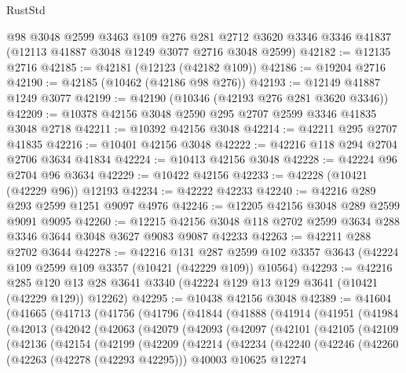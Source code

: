 \begin{lexlean}{RustStd}
\begin{coremodule}
    @98
    @3048
    @2599
    @3463
    @109
    @276
    @281
    @2712
    @3620
    @3346
    @3346
    @41837
    (@12113 @41887 @3048 @1249 @3077 @2716 @3048 @2599)
@42182 := @12135 @2716
@42185 := @42181 (@12123 (@42182 @109))
@42186 := @19204 @2716
@42190 := @42185 (@10462 (@42186 @98 @276))
@42193 := @12149 @41887 @1249 @3077
@42199 := @42190 (@10346 (@42193 @276 @281 @3620 @3346))
@42209 := @10378 @42156 @3048 @2590 @295 @2707 @2599 @3346 @41835 @3048 @2718
@42211 := @10392 @42156 @3048
@42214 := @42211 @295 @2707 @41835
@42216 := @10401 @42156 @3048
@42222 := @42216 @118 @294 @2704 @2706 @3634 @41834
@42224 := @10413 @42156 @3048
@42228 := @42224 @96 @2704 @96 @3634
@42229 := @10422 @42156
@42233 := @42228 (@10421 (@42229 @96)) @12193
@42234 := @42222 @42233
@42240 := @42216 @289 @293 @2599 @1251 @9097 @4976
@42246 := @12205 @42156 @3048 @289 @2599 @9091 @9095
@42260 := @12215 @42156 @3048 @118 @2702 @2599 @3634 @288 @3346 @3644 @3048 @3627 @9083 @9087 @42233
@42263 := @42211 @288 @2702 @3644
@42278 := @42216
    @131
    @287
    @2599
    @102
    @3357
    @3643
    (@42224 @109 @2599 @109 @3357 (@10421 (@42229 @109)) @10564)
@42293 := @42216
    @285
    @120
    @13
    @28
    @3641
    @3340
    (@42224 @129 @13 @129 @3641 (@10421 (@42229 @129)) @12262)
@42295 := @10438 @42156 @3048
@42389 := @41604
    (@41665
      (@41713
        (@41756
          (@41796
            (@41844
              (@41888
                (@41914
                  (@41951
                    (@41984
                      (@42013
                        (@42042
                          (@42063
                            (@42079
                              (@42093
                                (@42097
                                  (@42101
                                    (@42105
                                      (@42109
                                        (@42136
                                          (@42154
                                            (@42199
                                              (@42209
                                                (@42214
                                                  (@42234
                                                    (@42240
                                                      (@42246
                                                        (@42260
                                                          (@42263 (@42278 (@42293 @42295)))
                                                          @40003
                                                          @10625
                                                          @12274

\end{coremodule}
\end{lexlean}
